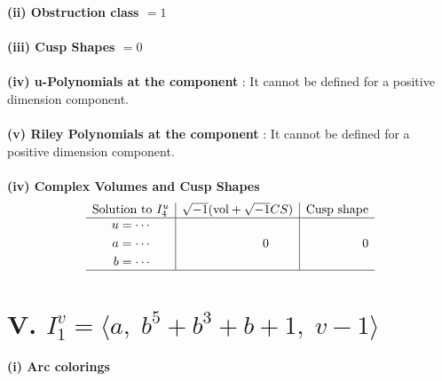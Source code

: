 \documentclass[1p]{elsarticle_modified}
\theoremstyle{definition}
\newcommand{\I}{\sqrt{-1}}
\begin{document}
\flushleft \textbf{(ii) Obstruction class $= 1$}\\~\\
\flushleft \textbf{(iii) Cusp Shapes $= 0$}\\~\\
\flushleft \textbf{(iv) u-Polynomials at the component} : It cannot be defined for a positive dimension component.\\~\\
\flushleft \textbf{(v) Riley Polynomials at the component} : It cannot be defined for a positive dimension component.\\~\\
\newpage\flushleft \textbf{(iv) Complex Volumes and Cusp Shapes}
$$\begin{array}{c|c|c} 
\text{Solution to }I^u_{4}& \I (\text{vol} + \sqrt{-1}CS) & \text{Cusp shape}\\
 \hline 
\begin{aligned}
u &= \cdots \\
a &= \cdots \\
b &= \cdots\end{aligned}
 & \phantom{-0.000000 } 0 & \phantom{-0.000000 } 0\\
 \hline 
 \end{array}
$$\newpage\renewcommand{\arraystretch}{1}
\centering \section*{V. $I^v_{1}= \langle a,\;b^5+b^3+b+1,\;v-1 \rangle$}
\flushleft \textbf{(i) Arc colorings}\\
\end{document}
